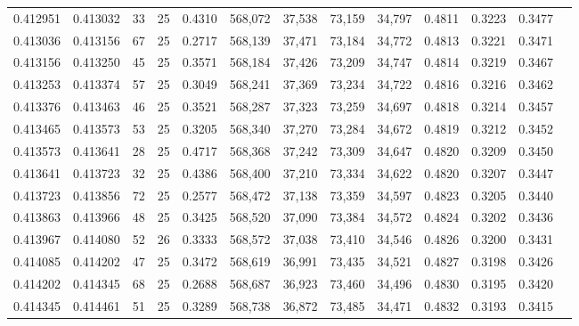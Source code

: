 \begin{tabular}{rrrrrrrrrrrrr}
0.412951 & 0.413032 &    33 &  25 &                                     0.4310 & 568,072 &  37,538 &  73,159 &  34,797 & 0.4811 & 0.3223 & 0.3477 \\
0.413036 & 0.413156 &    67 &  25 &                                     0.2717 & 568,139 &  37,471 &  73,184 &  34,772 & 0.4813 & 0.3221 & 0.3471 \\
0.413156 & 0.413250 &    45 &  25 &                                     0.3571 & 568,184 &  37,426 &  73,209 &  34,747 & 0.4814 & 0.3219 & 0.3467 \\
0.413253 & 0.413374 &    57 &  25 &                                     0.3049 & 568,241 &  37,369 &  73,234 &  34,722 & 0.4816 & 0.3216 & 0.3462 \\
0.413376 & 0.413463 &    46 &  25 &                                     0.3521 & 568,287 &  37,323 &  73,259 &  34,697 & 0.4818 & 0.3214 & 0.3457 \\
0.413465 & 0.413573 &    53 &  25 &                                     0.3205 & 568,340 &  37,270 &  73,284 &  34,672 & 0.4819 & 0.3212 & 0.3452 \\
0.413573 & 0.413641 &    28 &  25 &                                     0.4717 & 568,368 &  37,242 &  73,309 &  34,647 & 0.4820 & 0.3209 & 0.3450 \\
0.413641 & 0.413723 &    32 &  25 &                                     0.4386 & 568,400 &  37,210 &  73,334 &  34,622 & 0.4820 & 0.3207 & 0.3447 \\
0.413723 & 0.413856 &    72 &  25 &                                     0.2577 & 568,472 &  37,138 &  73,359 &  34,597 & 0.4823 & 0.3205 & 0.3440 \\
0.413863 & 0.413966 &    48 &  25 &                                     0.3425 & 568,520 &  37,090 &  73,384 &  34,572 & 0.4824 & 0.3202 & 0.3436 \\
0.413967 & 0.414080 &    52 &  26 &                                     0.3333 & 568,572 &  37,038 &  73,410 &  34,546 & 0.4826 & 0.3200 & 0.3431 \\
0.414085 & 0.414202 &    47 &  25 &                                     0.3472 & 568,619 &  36,991 &  73,435 &  34,521 & 0.4827 & 0.3198 & 0.3426 \\
0.414202 & 0.414345 &    68 &  25 &                                     0.2688 & 568,687 &  36,923 &  73,460 &  34,496 & 0.4830 & 0.3195 & 0.3420 \\
0.414345 & 0.414461 &    51 &  25 &                                     0.3289 & 568,738 &  36,872 &  73,485 &  34,471 & 0.4832 & 0.3193 & 0.3415 \\

\end{tabular}
